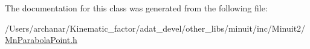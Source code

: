 The documentation for this class was generated from the following file\+:\begin{DoxyCompactItemize}
\item 
/\+Users/archanar/\+Kinematic\+\_\+factor/adat\+\_\+devel/other\+\_\+libs/minuit/inc/\+Minuit2/\mbox{\hyperlink{other__libs_2minuit_2inc_2Minuit2_2MnParabolaPoint_8h}{Mn\+Parabola\+Point.\+h}}\end{DoxyCompactItemize}
